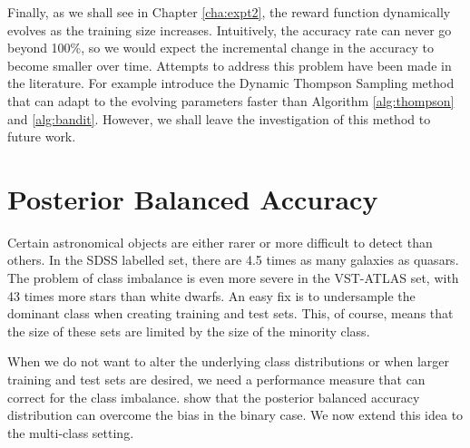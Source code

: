 Finally, as we shall see in Chapter \ref{cha:expt2}, the reward function 
dynamically evolves as the training size increases. Intuitively, the accuracy rate can never go
beyond 100\%, so we would expect the incremental change in the accuracy to become smaller over
time. Attempts to address this problem have been made in the literature. For example
 introduce the Dynamic Thompson Sampling method that can adapt to the evolving
parameters faster than Algorithm \ref{alg:thompson} and \ref{alg:bandit}. However, we shall leave
the investigation of this method to future work.


\section{Posterior Balanced Accuracy}   
\label{sec:measures}

Certain astronomical objects are either rarer or more difficult to detect than others. In the SDSS
labelled set, there are 4.5 times as many galaxies as quasars. The problem of class imbalance is
even more severe in the VST-ATLAS set, with 43 times more stars than white dwarfs. An easy fix is
to undersample the dominant class when creating training and test sets. This, of course, means that
the size of these sets are limited by the size of the minority class.

When we do not want to alter the underlying class distributions or when larger training and test
sets are desired, we need a performance measure that can correct for the class imbalance.
 show that the posterior balanced accuracy distribution can overcome the
bias in the binary case. We now extend this idea to the multi-class setting.

